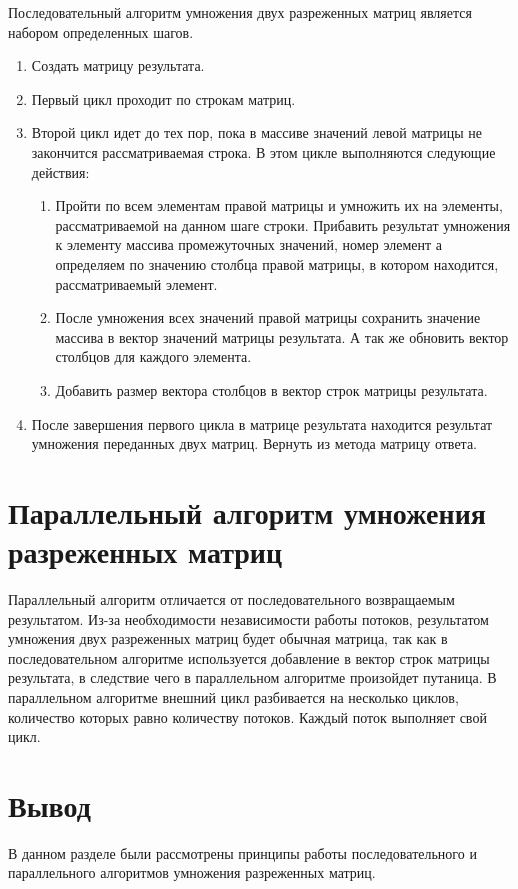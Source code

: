 Последовательный алгоритм умножения двух разреженных матриц является набором определенных шагов.
\begin{enumerate}
	\item Создать матрицу результата.
	\item Первый цикл проходит по строкам матриц.
	\item Второй цикл идет до тех пор, пока в массиве значений левой матрицы не закончится рассматриваемая строка. В этом цикле выполняются следующие действия:
	\begin{enumerate}
		\item Пройти по всем элементам правой матрицы и умножить их на элементы, рассматриваемой на данном шаге строки. Прибавить результат умножения к элементу массива промежуточных значений, номер элемент а определяем по значению столбца правой матрицы, в котором находится, рассматриваемый элемент.
		\item После умножения всех значений правой матрицы сохранить значение массива в вектор значений матрицы результата. А так же обновить вектор столбцов для каждого элемента.
		\item Добавить размер вектора столбцов в вектор строк матрицы результата.
	\end{enumerate}
	\item После завершения первого цикла в матрице результата находится результат умножения переданных двух матриц. Вернуть из метода матрицу ответа.
\end{enumerate}

\section{Параллельный алгоритм умножения разреженных матриц}

Параллельный алгоритм отличается от последовательного возвращаемым результатом. Из-за необходимости независимости работы потоков, результатом умножения двух разреженных матриц будет обычная матрица, так как в последовательном алгоритме используется добавление в вектор строк матрицы результата, в следствие чего в параллельном алгоритме произойдет путаница.
В параллельном алгоритме внешний цикл разбивается на несколько циклов, количество которых равно количеству потоков. Каждый поток выполняет свой цикл.

\section*{Вывод}

В данном разделе были рассмотрены принципы работы последовательного и параллельного алгоритмов умножения разреженных матриц.